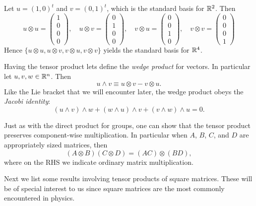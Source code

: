 \begin{example}{}{}
Let $u=(1,0)^t$ and $v=(0,1)^t$, which is the standard
basis for $\mathbb{R}^2$. Then
$$
u \otimes u=\left(\begin{array}{l}
1 \\
0 \\
0 \\
0
\end{array}\right), \quad u \otimes v=\left(\begin{array}{l}
0 \\
1 \\
0 \\
0
\end{array}\right), \quad v \otimes u=\left(\begin{array}{l}
0 \\
0 \\
1 \\
0
\end{array}\right), \quad v \otimes v=\left(\begin{array}{l}
0 \\
0 \\
0 \\
1
\end{array}\right)
$$
Hence $\{u\otimes u, u\otimes v, v\otimes u, v\otimes v\}$
yields the standard basis for $\mathbb{R}^4$.
\end{example}

Having the tensor product lets define the 
{\it wedge product} for vectors.
In particular let $u,v,w\in\mathbb{R}^n$. Then
\begin{equation}
u\wedge v \equiv u\otimes v-v\otimes u.
\end{equation}
Like the Lie bracket that we will encounter later,
the wedge product obeys the {\it Jacobi identity}:
\begin{equation}
(u\wedge v)\wedge w
+(w\wedge u)\wedge v
+(v\wedge w)\wedge u=0.
\end{equation}

Just as with the direct product for groups, one can show that
the tensor product preserves component-wise multiplication.
In particular when $A$, $B$, $C$, and $D$ are appropriately
sized matrices, then
\begin{equation}
(A\otimes B)(C\otimes D)=(AC)\otimes(BD),
\end{equation}
where on the RHS we indicate ordinary matrix multiplication.

Next we list some results involving tensor products of square matrices. These
will be of special interest to us since square matrices are the most commonly
encountered in physics.

